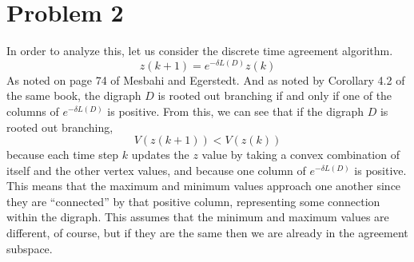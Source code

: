 \documentclass{article}
\begin{document}
\section*{Problem 2}
In order to analyze this, let us consider the discrete time agreement algorithm.
\[ z(k+1) = e^{-\delta L(D)}z(k) \]
As noted on page 74 of Mesbahi and Egerstedt. And as noted by Corollary 4.2 of
the same book, the digraph $D$ is rooted out branching if and only if one of the
columns of $e^{-\delta L(D)}$ is positive. From this, we can see that if the
digraph $D$ is rooted out branching, 
\[ V(z(k+1)) < V(z(k)) \]
because each time step $k$ updates the $z$ value by taking a convex combination
of itself and the other vertex values, and because one column of $e^{-\delta
L(D)}$ is positive. This means that the maximum and minimum values approach one
another since they are ``connected'' by that positive column, representing some
connection within the digraph. This assumes that the minimum and maximum values
are different, of course, but if they are the same then we are already in the
agreement subspace. 
\end{document}
